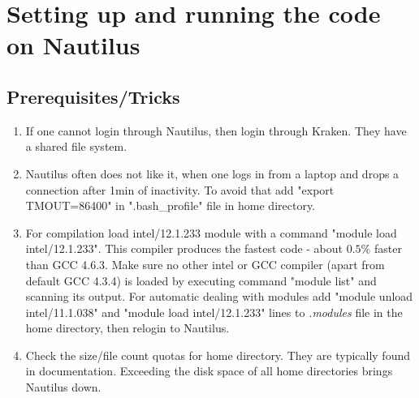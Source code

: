\documentclass{emulateapj}
\begin{document}
\section{Setting up and running the code on Nautilus}
\subsection{Prerequisites/Tricks}
\begin{enumerate}
\item{If one cannot login through Nautilus, then login through Kraken. They have a shared file system.}
\item{Nautilus often does not like it, when one logs in from a laptop and drops a connection after 1min of inactivity.
To avoid that add "export TMOUT=86400" in ".bash\_profile" file in home directory.}
\item{For compilation load intel/12.1.233 module with a command "module load intel/12.1.233". This compiler produces the fastest code - about $0.5\%$ faster than GCC 4.6.3.
Make sure no other intel or GCC compiler (apart from default GCC 4.3.4) is loaded by executing command "module list" and scanning its output.
For automatic dealing with modules add  "module unload intel/11.1.038" and "module load intel/12.1.233" lines to \textit{.modules} file in the home directory, then relogin to Nautilus.}
\item{Check the size/file count quotas for home directory. They are typically found in documentation. Exceeding the disk space of all home directories brings Nautilus down.}
\end{enumerate}
\end{document}
